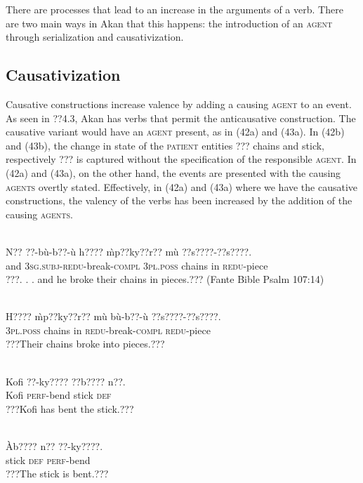 \documentclass[output=paper]{langsci/langscibook}
\begin{document}
There are processes that lead to an increase in the arguments of a verb. There are two main ways in Akan that this happens: the introduction of an \textsc{agent} through serialization and causativization.

\subsection{Causativization}

Causative constructions increase valence by adding a causing \textsc{agent} to an event. As seen in ??4.3, Akan has verbs that permit the anticausative construction. The causative variant would have an \textsc{agent} present, as in (42a) and (43a). In (42b) and (43b), the change in state of the \textsc{patient} entities ??? chains and stick, respectively ??? is captured without the specification of the responsible \textsc{agent}. In (42a) and (43a), on the other hand, the events are presented with the causing \textsc{agents} overtly stated. Effectively, in (42a) and (43a) where we have the causative constructions, the valency of the verbs has been increased by the addition of the causing \textsc{agents}.


\ea\label{ex:}
\\
\gll N??  ??-b\`{u}-b??-\`{u}      h????    \`{m}p??ky??r??  m\`{u}   ??s????-??s????.\\
     and  \textsc{3sg.subj}{}-\textsc{redu}{}-break-\textsc{compl}  \textsc{3pl.poss}  chains    in  \textsc{redu}{}-piece\\
\glt ???. . . and he broke their chains in pieces.??? (Fante Bible Psalm 107:14)
\z

\ea\label{ex:}
\\
\gll H????  \`{m}p??ky??r??   m\`{u}  b\`{u}-b??-\`{u}     ??s????-??s????.\\
     \textsc{3pl.poss}  chains    in  \textsc{redu}{}-break-\textsc{compl}  \textsc{redu}{}-piece\\
\glt ???Their chains broke into pieces.???
\z


\ea\label{ex:}
\\
\gll Kofi  ??-ky????    ??b????  n??.\\
     Kofi  \textsc{perf}{}-bend  stick  \textsc{def}\\
\glt ???Kofi has bent the stick.???
\z

\ea\label{ex:}
\\
\gll \`{A}b????  n??  ??-ky????.\\
     stick  \textsc{def}  \textsc{perf}{}-bend\\
\glt ???The stick is bent.???
\z
\end{document}
